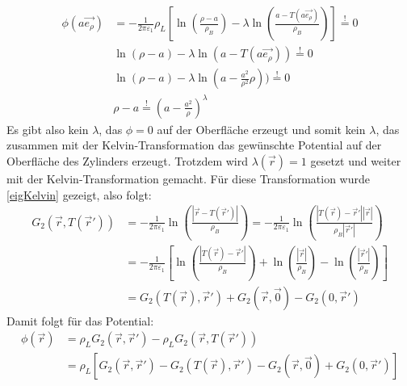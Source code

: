 		  	\begin{equation}\begin{split}
		  			\phi(a\vec{e_\rho}) & = -\frac{1}{2\pi\varepsilon_1}  \rho_L\left[\ln\left(\frac{\rho - a}{\rho_B} \right) -\lambda \ln\left(\frac{a - T(a\vec{e_\rho})}{\rho_B} \right)  \right] \stackrel{!}{=} 0 \\
		  			& \ln\left(\rho - a \right) -\lambda \ln(a - T(a\vec{e_\rho})) \stackrel{!}{=} 0 \\
		  			& \ln\left(\rho - a \right) -\lambda \ln(a - \frac{a^2}{\rho^2}\rho)) \stackrel{!}{=} 0 \\
		  			& \rho - a \stackrel{!}{=}  \left( a - \frac{a^2}{\rho}\right)^\lambda
		  	\end{split}\end{equation}
		  	 Es gibt also kein $\lambda$, das $\phi = 0$ auf der Oberfläche erzeugt und somit kein $\lambda$, das zusammen mit der Kelvin-Transformation das gewünschte Potential auf der Oberfläche des Zylinders erzeugt. Trotzdem wird $\lambda(\vec{r} )=1$ gesetzt und weiter mit der Kelvin-Transformation gemacht.
		  	 Für diese Transformation wurde \ref{eigKelvin} gezeigt, also folgt:
		  	\begin{equation}\begin{split}
		  			G_2(\vec{r} , T(\vec{r}' )) & = -\frac{1}{2\pi\varepsilon_1} \ln\left(\frac{\left|\vec{r}  - T(\vec{r}' )\right|  }{\rho_B} \right)  = -\frac{1}{2\pi\varepsilon_1} \ln\left(\frac{\left|T(\vec{r} ) - \vec{r}' \right|  \left| \vec{r} \right| }{\rho_B \left| \vec{r}' \right|} \right) \\
		  			&= -\frac{1}{2\pi\varepsilon_1} \left[ \ln\left(\frac{\left|T(\vec{r} ) - \vec{r}' \right| }{\rho_B } \right) + \ln\left(\frac{ \left| \vec{r} \right| }{\rho_B } \right) - \ln\left(\frac{ \left| \vec{r}' \right| }{\rho_B } \right)  \right]\\
		  			&= G_2(T(\vec{r} ), \vec{r}' ) + G_2(\vec{r} , \vec{0}) - G_2(0, \vec{r}' )
		  	\end{split}\end{equation}
		  	 Damit folgt für das Potential:
		  	\begin{equation}\begin{split}
		  			\phi(\vec{r} ) & = \rho_L G_2(\vec{r} , \vec{r}' ) -\rho_L G_2(\vec{r} , T(\vec{r}' )) \\
		  			&= \rho_L \left[ G_2(\vec{r} , \vec{r}' ) - G_2(T(\vec{r} ), \vec{r}' ) - G_2(\vec{r} , \vec{0}) + G_2(0, \vec{r}' )\right]
		  	\end{split}\end{equation}
